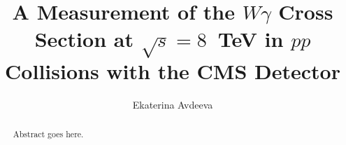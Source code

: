 \documentclass[print]{nuthesis}
\begin{document}
\frontmatter
\title{A Measurement of the $W\gamma$ Cross Section at $\sqrt{s}=8$~TeV in $pp$ Collisions with the CMS Detector}
\author{Ekaterina Avdeeva}
\maketitle
\begin{abstract}
 Abstract goes here.
\end{abstract}





\tableofcontents
\mainmatter

\end{document}
